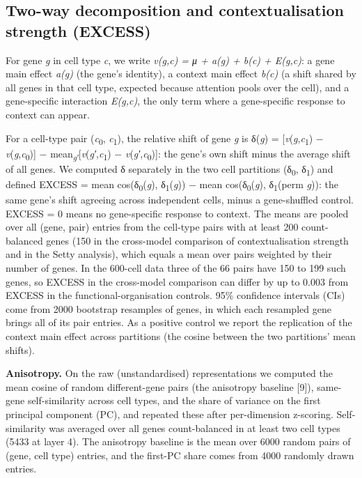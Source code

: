 \documentclass[
  11pt,
]{article}
\begin{document}
\subsection{Two-way decomposition and contextualisation strength
(EXCESS)}\label{two-way-decomposition-and-contextualisation-strength-excess}

For gene \emph{g} in cell type \emph{c}, we write \emph{v(g,c) = μ +
a(g) + b(c) + E(g,c)}: a gene main effect \emph{a(g)} (the gene's
identity), a context main effect \emph{b(c)} (a shift shared by all
genes in that cell type, expected because attention pools over the
cell), and a gene-specific interaction \emph{E(g,c)}, the only term
where a gene-specific response to context can appear.

For a cell-type pair (\emph{c}\textsubscript{0},
\emph{c}\textsubscript{1}), the relative shift of gene \emph{g} is
δ(\emph{g}) = {[}\emph{v}(\emph{g},\emph{c}\textsubscript{1}) −
\emph{v}(\emph{g},\emph{c}\textsubscript{0}){]} −
mean\textsubscript{\emph{g′}}{[}\emph{v}(\emph{g′},\emph{c}\textsubscript{1})
− \emph{v}(\emph{g′},\emph{c}\textsubscript{0}){]}: the gene's own shift
minus the average shift of all genes. We computed δ separately in the
two cell partitions (δ\textsubscript{0}, δ\textsubscript{1}) and defined
EXCESS = mean cos(δ\textsubscript{0}(\emph{g}),
δ\textsubscript{1}(\emph{g})) − mean cos(δ\textsubscript{0}(\emph{g}),
δ\textsubscript{1}(perm \emph{g})): the same gene's shift agreeing
across independent cells, minus a gene-shuffled control. EXCESS = 0
means no gene-specific response to context. The means are pooled over
all (gene, pair) entries from the cell-type pairs with at least 200
count-balanced genes (150 in the cross-model comparison of
contextualisation strength and in the Setty analysis), which equals a
mean over pairs weighted by their number of genes. In the 600-cell data
three of the 66 pairs have 150 to 199 such genes, so EXCESS in the
cross-model comparison can differ by up to 0.003 from EXCESS in the
functional-organisation controls. 95\% confidence intervals (CIs) come
from 2000 bootstrap resamples of genes, in which each resampled gene
brings all of its pair entries. As a positive control we report the
replication of the context main effect across partitions (the cosine
between the two partitions' mean shifts).

\textbf{Anisotropy.} On the raw (unstandardised) representations we
computed the mean cosine of random different-gene pairs (the anisotropy
baseline {[}9{]}), same-gene self-similarity across cell types, and the
share of variance on the first principal component (PC), and repeated
these after per-dimension z-scoring. Self-similarity was averaged over
all genes count-balanced in at least two cell types (5433 at layer 4).
The anisotropy baseline is the mean over 6000 random pairs of (gene,
cell type) entries, and the first-PC share comes from 4000 randomly
drawn entries.
\end{document}
